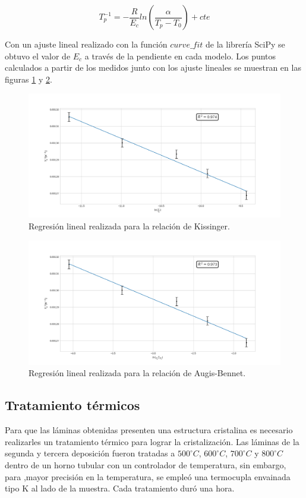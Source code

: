 \documentclass{article}
\theoremstyle{definition}
\theoremstyle{remark}
\begin{document}
\begin{equation}
	T_p^{-1}=-\frac{R}{E_c}ln(\frac{\alpha}{T_p-T_0})+cte
\end{equation}

Con un ajuste lineal realizado con la función $curve\_fit$ de la librería SciPy se obtuvo el valor de $E_c$ a través de la pendiente en cada modelo. Los puntos calculados a partir de los medidos junto con los ajuste lineales se muestran en las figuras \ref{Kiss} y \ref{AugBen}.


 \begin{figure}[H]
 	\centering
	\includegraphics[scale=0.4]{img/Kissinger.png}
 	\caption{Regresión lineal realizada para la relación de Kissinger.}
	\label{Kiss}
\end{figure} 

 \begin{figure}[H]
 	\centering
	\includegraphics[scale=0.4]{img/Augis_bennet.png}
 	\caption{Regresión lineal realizada para la relación de Augis-Bennet.}
	\label{AugBen}
\end{figure} 


\subsection{Tratamiento térmicos}
Para que las láminas obtenidas presenten una estructura cristalina es necesario realizarles un tratamiento térmico para lograr la cristalización. Las láminas de la segunda y tercera deposición fueron tratadas a $500 ^\circ C$, $600 ^\circ C$, $700 ^\circ C$ y $800 ^\circ C$ dentro de un horno tubular con un controlador de temperatura, sin embargo, para ,mayor precisión en la temperatura, se empleó una termocupla envainada tipo K al lado de la muestra. Cada tratamiento duró una hora.
\end{document}
